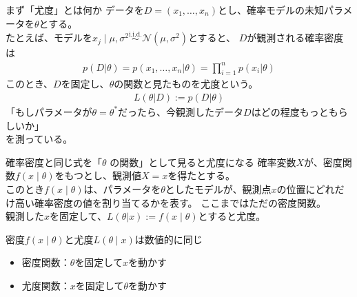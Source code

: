 \documentclass[dvipdfmx, 11pt, aspectratio=169, notheorems]{beamer}
\newcommand{\iid}{\stackrel{\mathrm{i.i.d.}}{\sim}}
\begin{document}
\begin{frame}{まず「尤度」とは何か}
    データを$D=(x_1, \ldots, x_n)$とし、確率モデルの未知パラメータを$\theta$とする。\\
    たとえば、モデルを$x_j \mid \mu, \sigma^2 \iid \mathcal{N}(\mu, \sigma^2)$とすると、
    $D$が観測される確率密度は
    \begin{align}
        p(D|\theta) = p(x_1, \ldots, x_n|\theta) = \prod_{i=1}^n p(x_i|\theta)
    \end{align}
    このとき、$D$を固定し、$\theta$の関数と見たものを尤度という。
    \begin{align}
        L(\theta|D) := p(D|\theta)
    \end{align}
    「もしパラメータが$\theta = \theta^*$だったら、今観測したデータ$D$はどの程度もっともらしいか」\\
    を測っている。
\end{frame}

\begin{frame}{確率密度と同じ式を「\(\theta\) の関数」として見ると尤度になる}
    確率変数$X$が、密度関数$f(x\mid\theta)$をもつとし、観測値$X=x$を得たとする。\\
    このとき$f(x\mid\theta)$は、パラメータを$\theta$としたモデルが、観測点$x$の位置にどれだけ高い確率密度の値を割り当てるかを表す。
    ここまではただの密度関数。\\
    \vspace{12pt}
    観測した$x$を固定して、$L(\theta|x):=f(x\mid\theta)$とすると尤度。
    \vspace{12pt}

    \begin{alertblock}{密度$f(x\mid\theta)$と尤度$L(\theta\mid x)$は数値的に同じ}
        \begin{itemize}
            \item 密度関数：$\theta$を固定して$x$を動かす
            \item 尤度関数：$x$を固定して$\theta$を動かす
        \end{itemize}
    \end{alertblock}
\end{frame}
\end{document}
